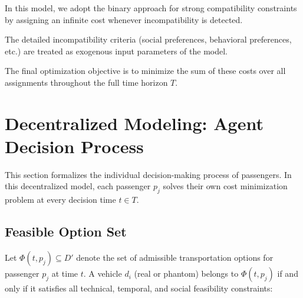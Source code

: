 \documentclass[12pt, a4paper]{article}
\begin{document}
In this model, we adopt the binary approach for strong compatibility constraints by assigning an infinite cost whenever incompatibility is detected.

The detailed incompatibility criteria (social preferences, behavioral preferences, etc.) are treated as exogenous input parameters of the model.

The final optimization objective is to minimize the sum of these costs over all assignments throughout the full time horizon $T$.


\section{Decentralized Modeling: Agent Decision Process}

This section formalizes the individual decision-making process of passengers. In this decentralized model, each passenger $p_j$ solves their own cost minimization problem at every decision time $t \in T$.

\subsection{Feasible Option Set}

Let $\Phi(t,p_j)\subseteq D'$ denote the set of admissible transportation options for passenger $p_j$ at time $t$. A vehicle $d_i$ (real or phantom) belongs to $\Phi(t,p_j)$ if and only if it satisfies all technical, temporal, and social feasibility constraints:
\end{document}
